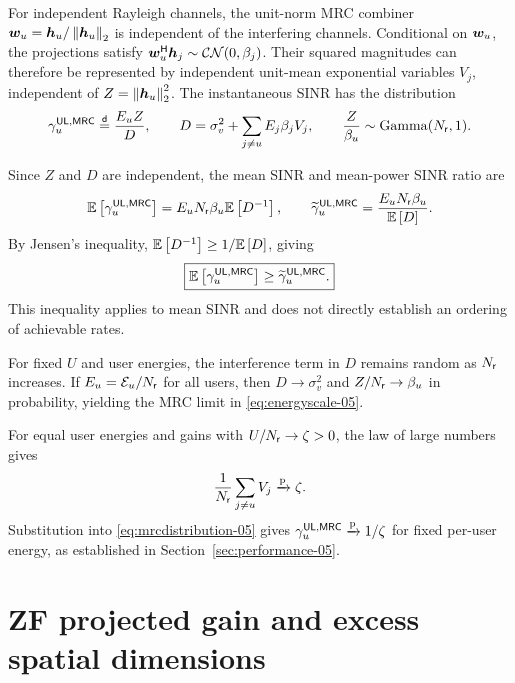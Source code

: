 For independent Rayleigh channels, the unit-norm MRC combiner $\bm{w}_u=\bm{h}_u/\left\|\bm{h}_u\right\|_2$ is independent of the interfering channels. Conditional on $\bm{w}_u$, the projections satisfy ${\bm{w}}^{\mathsf{H}}_u\bm{h}_j\sim\mathcal{CN}(0,\beta_j)$. Their squared magnitudes can therefore be represented by independent unit-mean exponential variables $V_j$, independent of $Z=\left\|\bm{h}_u\right\|_2^2$. The instantaneous SINR has the distribution
\begin{equation}
	\gamma_u^{\mathsf{UL},\mathsf{MRC}}
	\overset{\mathsf d}{=}
	\frac{E_u Z}{D},
	\qquad
	D=\sigma_v^2+\sum_{j\ne u}E_j\beta_jV_j,
	\qquad
	\frac{Z}{\beta_u}\sim\operatorname{Gamma}(N_{\mathsf{r}},1).
	\label{eq:mrcdistribution-05}
\end{equation}

Since $Z$ and $D$ are independent, the mean SINR and mean-power SINR ratio are
\begin{equation}
	\mathbb{E}\left[\gamma_u^{\mathsf{UL},\mathsf{MRC}}\right]
	=E_uN_{\mathsf{r}}\beta_u\mathbb{E}\left[D^{-1}\right],
	\qquad
	\widetilde\gamma_u^{\mathsf{UL},\mathsf{MRC}}
	=\frac{E_uN_{\mathsf{r}}\beta_u}{\mathbb{E}\left[D\right]}.
\end{equation}
By Jensen's inequality, $\mathbb{E}\left[D^{-1}\right]\geq1/\mathbb{E}\left[D\right]$, giving
\begin{equation}
	\boxed{
		\mathbb{E}\left[\gamma_u^{\mathsf{UL},\mathsf{MRC}}\right]
		\geq\widetilde\gamma_u^{\mathsf{UL},\mathsf{MRC}}.
	}
\end{equation}
This inequality applies to mean SINR and does not directly establish an ordering of achievable rates.

For fixed $U$ and user energies, the interference term in $D$ remains random as $N_{\mathsf{r}}$ increases. If $E_u=\mathcal E_u/N_{\mathsf{r}}$ for all users, then $D\to\sigma_v^2$ and $Z/N_{\mathsf{r}}\to\beta_u$ in probability, yielding the MRC limit in \eqref{eq:energyscale-05}.

For equal user energies and gains with $U/N_{\mathsf{r}}\to\zeta>0$, the law of large numbers gives
\begin{equation*}
	\frac{1}{N_{\mathsf{r}}}\sum_{j\ne u}V_j\xrightarrow{\mathrm p}\zeta.
\end{equation*}
Substitution into \eqref{eq:mrcdistribution-05} gives $\gamma_u^{\mathsf{UL},\mathsf{MRC}}\xrightarrow{\mathrm p}1/\zeta$ for fixed per-user energy, as established in Section~\ref{sec:performance-05}.



\section{ZF projected gain and excess spatial dimensions}


